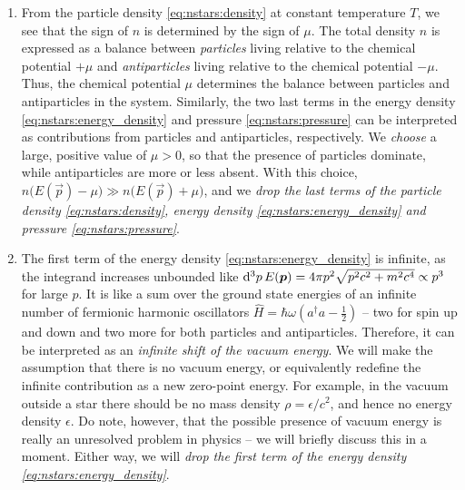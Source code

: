 \begin{enumerate}

\item
From the particle density \eqref{eq:nstars:density} at constant temperature $T$, we see that the sign of $n$ is determined by the sign of $\mu$.
The total density $n$ is expressed as a balance between \emph{particles} living relative to the chemical potential $+\mu$ and \emph{antiparticles} living relative to the chemical potential $-\mu$.
Thus, the chemical potential $\mu$ determines the balance between particles and antiparticles in the system.
Similarly, the two last terms in the energy density \eqref{eq:nstars:energy_density} and pressure \eqref{eq:nstars:pressure} can be interpreted as contributions from particles and antiparticles, respectively.
We \emph{choose} a large, positive value of $\mu > 0$, so that the presence of particles dominate, while antiparticles are more or less absent.
With this choice, $n \big( E(\vec{p}) - \mu \big) \gg n \big( E(\vec{p}) + \mu \big)$, and we \emph{drop the last terms of the particle density \eqref{eq:nstars:density}, energy density \eqref{eq:nstars:energy_density} and pressure \eqref{eq:nstars:pressure}}.

\item
The first term of the energy density \eqref{eq:nstars:energy_density} is infinite, as the integrand increases unbounded like $\mathop{}\!\mathrm{d}^3 p \, E({\bm{p}}) = 4 \pi p^2 \sqrt{p^2 c^2 + m^2 c^4} \propto p^3$ for large $p$.
It is like a sum over the ground state energies of an infinite number of fermionic harmonic oscillators $\hat{H} = \hbar \omega \left( a^\dagger a - \frac{1}{2} \right)$ -- two for spin up and down and two more for both particles and antiparticles.
Therefore, it can be interpreted as an \emph{infinite shift of the vacuum energy}.
We will make the assumption that there is no vacuum energy, or equivalently redefine the infinite contribution as a new zero-point energy.
For example, in the vacuum outside a star there should be no mass density $\rho = \epsilon / c^2$, and hence no energy density $\epsilon$.
Do note, however, that the possible presence of vacuum energy is really an unresolved problem in physics -- we will briefly discuss this in a moment.
Either way, we will \emph{drop the first term of the energy density \eqref{eq:nstars:energy_density}}.


\end{enumerate}
